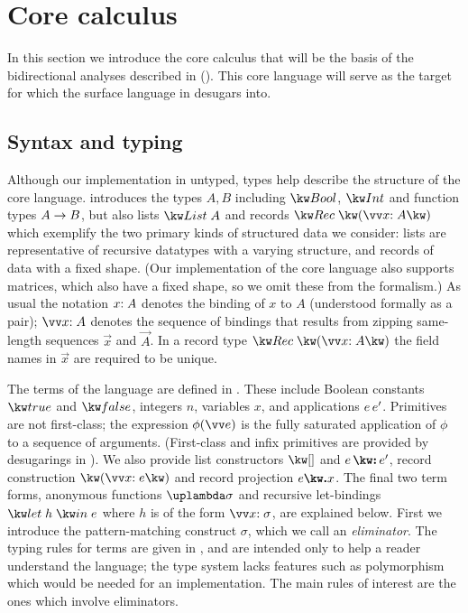 \section{Core calculus}
\label{sec:core-language}

In this section we introduce the core calculus that will be the basis of the bidirectional analyses described in (). This core language will serve as the target for which the surface language in  desugars into. 

\subsection{Syntax and typing}
\label{sec:core-language:syntax-typing}

Although our implementation in untyped, types help describe the structure of the core language.  introduces the types $A, B$ including $\tyBool$, $\tyInt$ and function types ${A}\rightarrow{B}$, but also lists $\tyList{A}$ and records $\tyRec{\vec{\bind{x}{A}}}$ which exemplify the two primary kinds of structured data we consider: lists are representative of recursive datatypes with a varying structure, and records of data with a fixed shape. (Our implementation of the core language also supports matrices, which also have a fixed shape, so we omit these from the formalism.) As usual the notation $x{:}\;A$ denotes the binding of $x$ to $A$ (understood formally as a pair); $\seq{\bind{x}{A}}$ denotes the sequence of bindings that results from zipping same-length sequences $\vec{x}$ and $\vec{A}$. In a record type $\tyRec{\vec{\bind{x}{A}}}$ the field names in $\vec{x}$ are required to be unique.



The terms of the language are defined in . These include Boolean constants $\exTrue$ and $\exFalse$, integers $n$, variables $x$, and applications ${e}\,{e'}$. Primitives are not first-class; the expression $\exAppPrim{\phi}{\vec{e}}$ is the fully saturated application of $\phi$ to a sequence of arguments. (First-class and infix primitives are provided by desugarings in ). We also provide list constructors $\exNil$ and $\exCons{e}{e'}$, record construction $\exRec{\vec{\bind{x}{e}}}$ and record projection $\exRecProj{e}{x}$. The final two term forms, anonymous functions $\exLambda{\sigma}$ and recursive let-bindings $\exLetRecMutual{h}{e}$ where $h$ is of the form $\vec{\bind{x}{\sigma}}$, are explained below. First we introduce the pattern-matching construct $\sigma$, which we call an \emph{eliminator}. The typing rules for terms are given in , and are intended only to help a reader understand the language; the type system lacks features such as polymorphism which would be needed for an implementation. The main rules of interest are the ones which involve eliminators.

